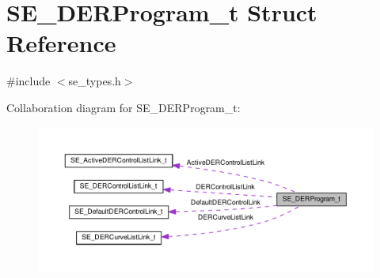 \hypertarget{structSE__DERProgram__t}{}\section{S\+E\+\_\+\+D\+E\+R\+Program\+\_\+t Struct Reference}
\label{structSE__DERProgram__t}


{\ttfamily \#include $<$se\+\_\+types.\+h$>$}



Collaboration diagram for S\+E\+\_\+\+D\+E\+R\+Program\+\_\+t\+:\nopagebreak
\begin{figure}[H]
\begin{center}
\leavevmode
\includegraphics[width=350pt]{structSE__DERProgram__t__coll__graph}
\end{center}
\end{figure}
